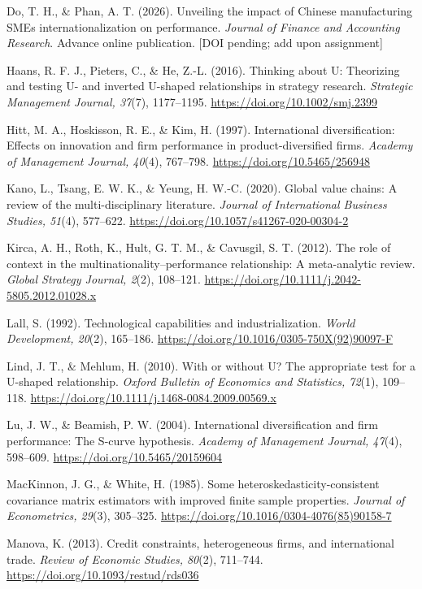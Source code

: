 \documentclass[12pt,a4paper]{article}
\begin{document}
Do, T. H., \& Phan, A. T. (2026). Unveiling the impact of Chinese
manufacturing SMEs\textquotesingle{} internationalization on
performance. \emph{Journal of Finance and Accounting Research}. Advance
online publication. {[}DOI pending; add upon assignment{]}

Haans, R. F. J., Pieters, C., \& He, Z.-L. (2016). Thinking about U:
Theorizing and testing U- and inverted U-shaped relationships in
strategy research. \emph{Strategic Management Journal, 37}(7),
1177--1195. \url{https://doi.org/10.1002/smj.2399}

Hitt, M. A., Hoskisson, R. E., \& Kim, H. (1997). International
diversification: Effects on innovation and firm performance in
product-diversified firms. \emph{Academy of Management Journal, 40}(4),
767--798. \url{https://doi.org/10.5465/256948}

Kano, L., Tsang, E. W. K., \& Yeung, H. W.-C. (2020). Global value
chains: A review of the multi-disciplinary literature. \emph{Journal of
International Business Studies, 51}(4), 577--622.
\url{https://doi.org/10.1057/s41267-020-00304-2}

Kirca, A. H., Roth, K., Hult, G. T. M., \& Cavusgil, S. T. (2012). The
role of context in the multinationality--performance relationship: A
meta-analytic review. \emph{Global Strategy Journal, 2}(2), 108--121.
\url{https://doi.org/10.1111/j.2042-5805.2012.01028.x}

Lall, S. (1992). Technological capabilities and industrialization.
\emph{World Development, 20}(2), 165--186.
\url{https://doi.org/10.1016/0305-750X(92)90097-F}

Lind, J. T., \& Mehlum, H. (2010). With or without U? The appropriate
test for a U-shaped relationship. \emph{Oxford Bulletin of Economics and
Statistics, 72}(1), 109--118.
\url{https://doi.org/10.1111/j.1468-0084.2009.00569.x}

Lu, J. W., \& Beamish, P. W. (2004). International diversification and
firm performance: The S-curve hypothesis. \emph{Academy of Management
Journal, 47}(4), 598--609. \url{https://doi.org/10.5465/20159604}

MacKinnon, J. G., \& White, H. (1985). Some
heteroskedasticity-consistent covariance matrix estimators with improved
finite sample properties. \emph{Journal of Econometrics, 29}(3),
305--325. \url{https://doi.org/10.1016/0304-4076(85)90158-7}

Manova, K. (2013). Credit constraints, heterogeneous firms, and
international trade. \emph{Review of Economic Studies, 80}(2), 711--744.
\url{https://doi.org/10.1093/restud/rds036}
\end{document}
